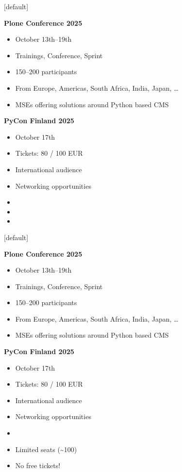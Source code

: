 \documentclass[12pt,aspectratio=169]{beamer}
\begin{document}
[default]
\begin{frame}
  \begin{minipage}{0.48\textwidth}
    \textbf{Plone Conference 2025}
    \begin{itemize}
      \item October 13th–19th
      \item Trainings, Conference, Sprint
      \item 150–200 participants
      \item From Europe, Americas, South Africa, India, Japan, \ldots
      \item MSEs offering solutions around Python based CMS
    \end{itemize}
  \end{minipage}
  \hfill
  \begin{minipage}{0.48\textwidth}
    \textbf{PyCon Finland 2025}
    \begin{itemize}
      \item October 17th
      \item Tickets: 80 / 100 EUR
      \item International audience
      \item Networking opportunities
      \item[]
      \item[]
      \item[]
    \end{itemize}
  \end{minipage}
\end{frame}

[default]
\begin{frame}
  \begin{minipage}{0.48\textwidth}
    \textbf{Plone Conference 2025}
    \begin{itemize}
      \item October 13th–19th
      \item Trainings, Conference, Sprint
      \item 150–200 participants
      \item From Europe, Americas, South Africa, India, Japan, \ldots
      \item MSEs offering solutions around Python based CMS
    \end{itemize}
  \end{minipage}
  \hfill
  \begin{minipage}{0.48\textwidth}
    \textbf{PyCon Finland 2025}
    \begin{itemize}
      \item October 17th
      \item Tickets: 80 / 100 EUR
      \item International audience
      \item Networking opportunities
      \item[]
      \item Limited seats (\textasciitilde 100)
      \item No free tickets!
    \end{itemize}
  \end{minipage}
\end{frame}
\end{document}
